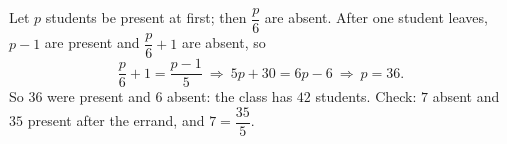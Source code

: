 Let $p$ students be present at first; then $\dfrac {p}{6}$ are absent. After one student leaves, $p-1$ are present and $\dfrac {p}{6}+1$ are absent, so
\[
\dfrac {p}{6}+1=\dfrac{p-1}{5}\ \Longrightarrow\ 5p+30=6p-6\ \Longrightarrow\ p=36 .
\]
So $36$ were present and $6$ absent: the class has $\boxed{42}$ students. Check: $7$ absent and $35$ present after the errand, and $7=\dfrac{35}{5}$.
